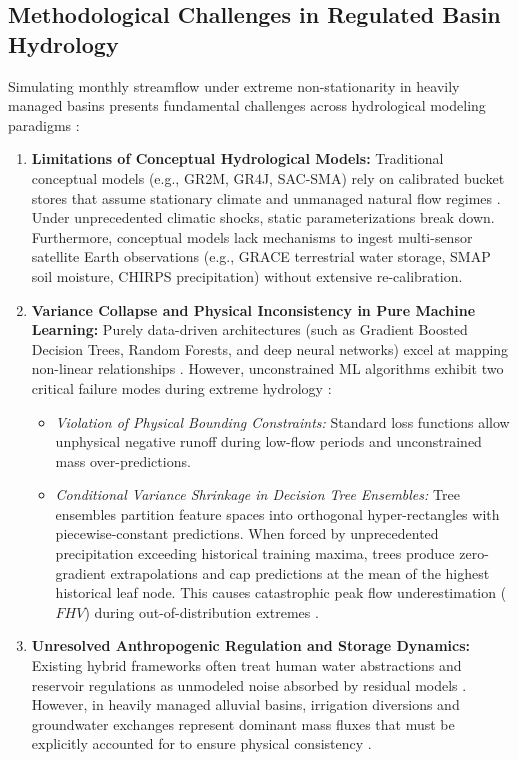 \documentclass[11pt,a4paper,fleqn]{article}
\begin{document}
\subsection{Methodological Challenges in Regulated Basin Hydrology}

Simulating monthly streamflow under extreme non-stationarity in heavily managed basins presents fundamental challenges across hydrological modeling paradigms \citep{droppers2024hydrometeorology, mukhopadhyay2024applied, singh2024hydrological}:

\begin{enumerate}
    \item \textbf{Limitations of Conceptual Hydrological Models:} Traditional conceptual models (e.g., GR2M, GR4J, SAC-SMA) rely on calibrated bucket stores that assume stationary climate and unmanaged natural flow regimes \citep{frame2022post, perrin2003improvement}. Under unprecedented climatic shocks, static parameterizations break down. Furthermore, conceptual models lack mechanisms to ingest multi-sensor satellite Earth observations (e.g., GRACE terrestrial water storage, SMAP soil moisture, CHIRPS precipitation) without extensive re-calibration.
    \item \textbf{Variance Collapse and Physical Inconsistency in Pure Machine Learning:} Purely data-driven architectures (such as Gradient Boosted Decision Trees, Random Forests, and deep neural networks) excel at mapping non-linear relationships \citep{kratzert2018rainfall, nearing2024global, shen2023differentiable}. However, unconstrained ML algorithms exhibit two critical failure modes during extreme hydrology \citep{beven2020deep, jia2021physics, read2019process}:
    \begin{itemize}
        \item \emph{Violation of Physical Bounding Constraints:} Standard loss functions allow unphysical negative runoff during low-flow periods and unconstrained mass over-predictions.
        \item \emph{Conditional Variance Shrinkage in Decision Tree Ensembles:} Tree ensembles partition feature spaces into orthogonal hyper-rectangles with piecewise-constant predictions. When forced by unprecedented precipitation exceeding historical training maxima, trees produce zero-gradient extrapolations and cap predictions at the mean of the highest historical leaf node. This causes catastrophic peak flow underestimation ($FHV$) during out-of-distribution extremes \citep{grinsztajn2022why, read2019process}.
    \end{itemize}
    \item \textbf{Unresolved Anthropogenic Regulation and Storage Dynamics:} Existing hybrid frameworks often treat human water abstractions and reservoir regulations as unmodeled noise absorbed by residual models \citep{al2023physics, li2026process}. However, in heavily managed alluvial basins, irrigation diversions and groundwater exchanges represent dominant mass fluxes that must be explicitly accounted for to ensure physical consistency \citep{hossain2025satellite, rodell2018emerging, zhang2025hybrid}.
\end{enumerate}
\end{document}
